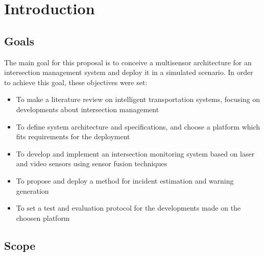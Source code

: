 \chapter [Introduction]{Introduction}

\section{Goals}

The main goal for this proposal is to conceive a multisensor architecture for an intersection management system and deploy it in a simulated scenario. In order to achieve this goal, these objectives were set:

\begin{itemize}
\item To make a literature review on intelligent transportation systems, focusing on developments about intersection management
\item To define system architecture and specifications, and choose a platform which fits requirements for the deployment
\item To develop and implement an intersection monitoring system based on laser and video sensors using sensor fusion techniques
\item To propose and deploy a method for incident estimation and warning generation
\item To set a test and evaluation protocol for the developments made on the choosen platform 
\end{itemize}

\section{Scope}
